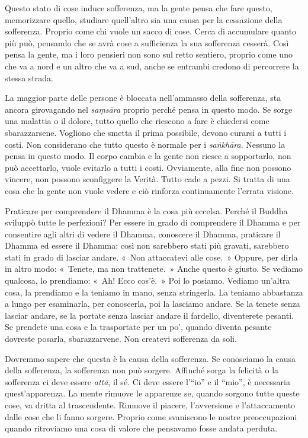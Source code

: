 Questo stato di cose induce sofferenza, ma la gente pensa che fare
questo, memorizzare quello, studiare quell'altro sia una causa per la
cessazione della sofferenza. Proprio come chi vuole un sacco di cose.
Cerca di accumulare quanto più può, pensando che se avrà cose a
sufficienza la sua sofferenza cesserà. Così pensa la gente, ma i loro
pensieri non sono sul retto sentiero, proprio come uno che va a nord e
un altro che va a sud, anche se entrambi credono di percorrere la stessa
strada.

La maggior parte delle persone è bloccata nell'ammasso della sofferenza,
sta ancora girovagando nel \emph{saṃsāra} proprio perché pensa in questo
modo. Se sorge una malattia o il dolore, tutto quello che riescono a
fare è chiedersi come sbarazzarsene. Vogliono che smetta il prima
possibile, devono curarsi a tutti i costi. Non considerano che tutto
questo è normale per i \emph{saṅkhāra}. Nessuno la pensa in questo modo.
Il corpo cambia e la gente non riesce a sopportarlo, non può accettarlo,
vuole evitarlo a tutti i costi. Ovviamente, alla fine non possono
vincere, non possono sconfiggere la Verità. Tutto cade a pezzi. Si
tratta di una cosa che la gente non vuole vedere e ciò rinforza
continuamente l'errata visione.

Praticare per comprendere il Dhamma è la cosa più eccelsa. Perché il
Buddha sviluppò tutte le perfezioni? Per essere in grado di comprendere
il Dhamma e per consentire agli altri di vedere il Dhamma, conoscere il
Dhamma, praticare il Dhamma ed essere il Dhamma: così non sarebbero
stati più gravati, sarebbero stati in grado di lasciar andare. «~Non
attaccatevi alle cose.~» Oppure, per dirla in altro modo: «~Tenete, ma
non trattenete.~» Anche questo è giusto. Se vediamo qualcosa, lo
prendiamo: «~Ah! Ecco cos'è.~» Poi lo posiamo. Vediamo un'altra cosa, la
prendiamo e la teniamo in mano, senza stringerla. La teniamo abbastanza
a lungo per esaminarla, per conoscerla, poi la lasciamo andare. Se la
tenete senza lasciar andare, se la portate senza lasciar andare il
fardello, diventerete pesanti. Se prendete una cosa e la trasportate per
un po', quando diventa pesante dovreste posarla, sbarazzarvene. Non
createvi sofferenza da soli.

Dovremmo sapere che questa è la causa della sofferenza. Se conosciamo la
causa della sofferenza, la sofferenza non può sorgere. Affinché sorga la
felicità o la sofferenza ci deve essere \emph{attā}, il sé. Ci deve
essere l'``io'' e il ``mio'', è necessaria quest'apparenza. La mente
rimuove le apparenze se, quando sorgono tutte queste cose, va dritta al
trascendente. Rimuove il piacere, l'avversione e l'attaccamento dalle
cose che li fanno sorgere. Proprio come svaniscono le nostre
preoccupazioni quando ritroviamo una cosa di valore che pensavamo fosse
andata perduta.

